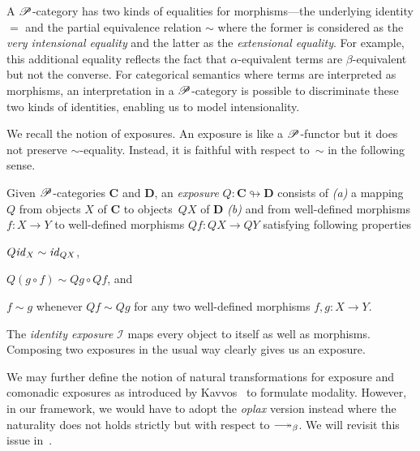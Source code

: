 \documentclass[a4paper,UKenglish,numberwithinsect,cleveref,thm-restate]{lipics-v2021}
\numberwithin{equation}{section}
\theoremstyle{plain}
\begin{document}
A $\mathscr{P}$-category has two kinds of equalities for morphisms---the underlying identity $=$ and the partial equivalence relation $\sim$ where the former is considered as the \emph{very intensional equality} and the latter as the \emph{extensional equality}. 
For example, this additional equality reflects the fact that $\alpha$-equivalent terms are $\beta$-equivalent but not the converse.
For categorical semantics where terms are interpreted as morphisms, an interpretation in a $\mathscr{P}$-category is possible to discriminate these two kinds of identities, enabling us to model intensionality.

We recall the notion of exposures.
An exposure is like a $\mathscr{P}$-functor but it does not preserve $\sim$-equality.
Instead, it is faithful with respect to~$\sim$ in the following sense.
\begin{definition}
  Given $\mathscr{P}$-categories $\mathbf{C}$ and $\mathbf{D}$, an \emph{exposure} $Q\colon \mathbf{C} \looparrowright \mathbf{D}$ consists of \emph{(a)} a mapping $Q$ from objects $X$ of $\mathbf{C}$ to objects~$QX$ of $\mathbf{D}$ \emph{(b)} and from well-defined morphisms $f\colon X \to Y$ to well-defined morphisms $Qf\colon QX \to QY$ satisfying following properties
  \begin{romanenumerate}
    \item $Q\mathit{id}_X \sim \mathit{id}_{QX}$,
    \item $Q(g \circ f) \sim Qg \circ Qf$, and
    \item $f \sim g$ whenever $Qf \sim Qg$ for any two well-defined morphisms $f, g\colon X \to Y$. 
  \end{romanenumerate}
\end{definition}


The \emph{identity exposure} $\mathcal{I}$ maps every object to itself as well as morphisms.
Composing two exposures in the usual way clearly gives us an exposure. 

We may further define the notion of natural transformations for exposure and comonadic exposures as introduced by Kavvos~\cite{Kavvos2017b} to formulate \SFour modality.
However, in our framework, we would have to adopt the \emph{oplax} version instead where the naturality does not holds strictly but with respect to $\reduce$.
We will revisit this issue in~.
\end{document}
